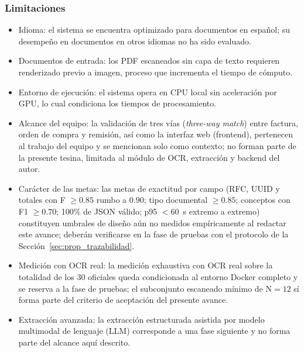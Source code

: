 \subsubsection{Limitaciones} \label{subsec:limitaciones}
\begin{itemize}
    \item Idioma: el sistema se encuentra optimizado para documentos en español; su desempeño en documentos en otros idiomas no ha sido evaluado.
    \item Documentos de entrada: los PDF escaneados sin capa de texto requieren renderizado previo a imagen, proceso que incrementa el tiempo de cómputo.
    \item Entorno de ejecución: el sistema opera en CPU local sin aceleración por GPU, lo cual condiciona los tiempos de procesamiento.
    \item Alcance del equipo: la validación de tres vías (\textit{three-way match}) entre factura, orden de compra y remisión, así como la interfaz web (frontend), pertenecen al trabajo del equipo y se mencionan solo como contexto; no forman parte de la presente tesina, limitada al módulo de OCR, extracción y backend del autor.
    \item Carácter de las metas: las metas de exactitud por campo (RFC, UUID y totales con F $\geq 0.85$ rumbo a $0.90$; tipo documental $\geq 0.85$; conceptos con F1 $\geq 0.70$; 100\% de JSON válido; p95 $< 60$~s extremo a extremo) constituyen umbrales de diseño aún no medidos empíricamente al redactar este avance; deberán verificarse en la fase de pruebas con el protocolo de la Sección~\ref{sec:prop_trazabilidad}.
    \item Medición con OCR real: la medición exhaustiva con OCR real sobre la totalidad de los 30 oficiales queda condicionada al entorno Docker completo y se reserva a la fase de pruebas; el subconjunto escaneado mínimo de N${=}12$ sí forma parte del criterio de aceptación del presente avance.
    \item Extracción avanzada: la extracción estructurada asistida por modelo multimodal de lenguaje (LLM) corresponde a una fase siguiente y no forma parte del alcance aquí descrito.
\end{itemize}
